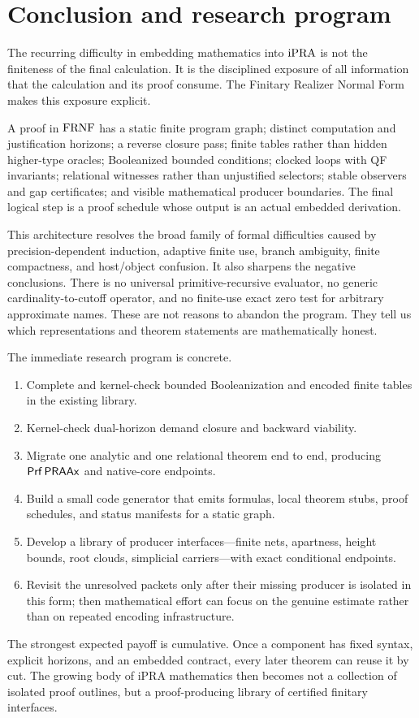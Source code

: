 \section{Conclusion and research program}
\label{sec:conclusion}

The recurring difficulty in embedding mathematics into \(\mathrm{iPRA}\) is not the finiteness
of the final calculation.  It is the disciplined exposure of all information that the
calculation and its proof consume.  The Finitary Realizer Normal Form makes this
exposure explicit.

A proof in \(\mathrm{FRNF}\) has a static finite program graph; distinct computation and
justification horizons; a reverse closure pass; finite tables rather than hidden
higher-type oracles; Booleanized bounded conditions; clocked loops with QF invariants;
relational witnesses rather than unjustified selectors; stable observers and gap
certificates; and visible mathematical producer boundaries.  The final logical step is
a proof schedule whose output is an actual embedded derivation.

This architecture resolves the broad family of formal difficulties caused by
precision-dependent induction, adaptive finite use, branch ambiguity, finite
compactness, and host/object confusion.  It also sharpens the negative conclusions.
There is no universal primitive-recursive evaluator, no generic cardinality-to-cutoff
operator, and no finite-use exact zero test for arbitrary approximate names.  These are
not reasons to abandon the program.  They tell us which representations and theorem
statements are mathematically honest.

The immediate research program is concrete.

\begin{enumerate}[label=\arabic*.,leftmargin=2.2em]
\item Complete and kernel-check bounded Booleanization and encoded finite tables in the
existing  library.
\item Kernel-check dual-horizon demand closure and backward viability.
\item Migrate one analytic and one relational theorem end to end, producing
\(\mathsf{Prf}\,\mathsf{PRAAx}\) and native-core endpoints.
\item Build a small code generator that emits formulas, local theorem stubs, proof
schedules, and status manifests for a static graph.
\item Develop a library of producer interfaces---finite nets, apartness, height bounds,
root clouds, simplicial carriers---with exact conditional endpoints.
\item Revisit the unresolved packets only after their missing producer is isolated in
this form; then mathematical effort can focus on the genuine estimate rather than on
repeated encoding infrastructure.
\end{enumerate}

The strongest expected payoff is cumulative.  Once a component has fixed syntax,
explicit horizons, and an embedded contract, every later theorem can reuse it by cut.
The growing body of iPRA mathematics then becomes not a collection of isolated proof
outlines, but a proof-producing library of certified finitary interfaces.
